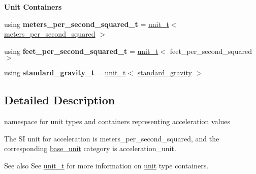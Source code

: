 \begin{Indent}{\bf Unit Containers}\par
{\em \label{namespaceunits_1_1acceleration_accelerationContainers}%
\hypertarget{namespaceunits_1_1acceleration_accelerationContainers}{}%
}\begin{DoxyCompactItemize}
\item 
\hypertarget{namespaceunits_1_1acceleration_a7fde8bdef3c7d89434efc64aa4aa3357}{}using {\bfseries meters\+\_\+per\+\_\+second\+\_\+squared\+\_\+t} = \hyperlink{classunits_1_1unit__t}{unit\+\_\+t}$<$ \hyperlink{structunits_1_1unit}{meters\+\_\+per\+\_\+second\+\_\+squared} $>$\label{namespaceunits_1_1acceleration_a7fde8bdef3c7d89434efc64aa4aa3357}

\item 
\hypertarget{namespaceunits_1_1acceleration_a02cf288b3788ae4b3c0126229a232530}{}using {\bfseries feet\+\_\+per\+\_\+second\+\_\+squared\+\_\+t} = \hyperlink{classunits_1_1unit__t}{unit\+\_\+t}$<$ feet\+\_\+per\+\_\+second\+\_\+squared $>$\label{namespaceunits_1_1acceleration_a02cf288b3788ae4b3c0126229a232530}

\item 
\hypertarget{namespaceunits_1_1acceleration_a84ed6ce9398d72f3f6b94b1bfcf629bb}{}using {\bfseries standard\+\_\+gravity\+\_\+t} = \hyperlink{classunits_1_1unit__t}{unit\+\_\+t}$<$ \hyperlink{structunits_1_1unit}{standard\+\_\+gravity} $>$\label{namespaceunits_1_1acceleration_a84ed6ce9398d72f3f6b94b1bfcf629bb}

\end{DoxyCompactItemize}
\end{Indent}


\subsection{Detailed Description}
namespace for unit types and containers representing acceleration values 

The S\+I unit for acceleration is {\ttfamily meters\+\_\+per\+\_\+second\+\_\+squared}, and the corresponding {\ttfamily \hyperlink{structunits_1_1base__unit}{base\+\_\+unit}} category is {\ttfamily acceleration\+\_\+unit}. \begin{DoxySeeAlso}{See also}
See \hyperlink{classunits_1_1unit__t}{unit\+\_\+t} for more information on \hyperlink{structunits_1_1unit}{unit} type containers. 
\end{DoxySeeAlso}
